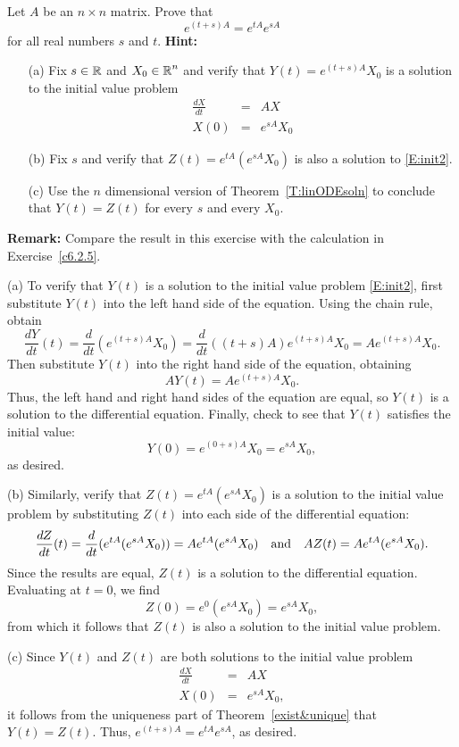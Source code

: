 \documentclass{ximera}
\begin{document}
\begin{computerExercise}  \label{c6.2.5B}
Let $A$ be an $n\times n$ matrix.  Prove that
\[
e^{(t+s)A} = e^{tA}e^{sA}
\]
for all real numbers $s$ and $t$.  {\bf Hint:}
\begin{itemize}
\item[(a)]  Fix $s\in\mbox{$\Bbb{R}$}$ and $X_0\in\mbox{$\Bbb{R}$}^n$ and verify that
$Y(t) = e^{(t+s)A}X_0$ is a solution to the initial value problem
\begin{equation}  \label{E:init2}
\begin{array}{rcl}
\frac{dX}{dt} & = & AX \\
X(0) & = & e^{sA}X_0
\end{array}
\end{equation}
\item[(b)] Fix $s$ and verify that $Z(t) = e^{tA}\left(e^{sA}X_0\right)$ is
also a solution to \eqref{E:init2}.
\item[(c)]  Use the $n$ dimensional version of Theorem~\ref{T:linODEsoln} to
conclude that $Y(t)=Z(t)$ for every $s$ and every $X_0$.
\end{itemize}
{\bf Remark:}  Compare the result in this exercise with the calculation in
Exercise~\ref{c6.2.5}.

\begin{solution}

(a) To verify that $Y(t)$ is a solution to the initial value problem
\eqref{E:init2}, first substitute $Y(t)$ into the left hand side of the
equation.  Using the chain rule, obtain
\[
\frac{dY}{dt}(t) = \frac{d}{dt}(e^{(t + s)A}X_0) =
\frac{d}{dt}((t + s)A)e^{(t + s)A}X_0 = Ae^{(t + s)A}X_0.
\]
Then substitute $Y(t)$ into the right hand side of the equation, obtaining
\[
AY(t) = Ae^{(t + s)A}X_0.
\]
Thus, the left hand and right hand sides of the equation are equal, so
$Y(t)$ is a solution to the differential equation.  Finally, check to see
that $Y(t)$ satisfies the initial value:
\[
Y(0) = e^{(0 + s)A}X_0 = e^{sA}X_0,
\]
as desired.

(b) Similarly, verify that $Z(t) = e^{tA}(e^{sA}X_0)$ is a solution to the
initial value problem by substituting $Z(t)$ into each side of the
differential equation:
\[
\frac{dZ}{dt}(t) = \frac{d}{dt}(e^{tA}(e^{sA}X_0))
= Ae^{tA}(e^{sA}X_0) \quad\mbox{and}\quad
AZ(t) = Ae^{tA}(e^{sA}X_0).
\]
Since the results are equal, $Z(t)$ is a solution to the differential
equation.  Evaluating at $t = 0$, we find
\[
Z(0) = e^{0}(e^{sA}X_0) = e^{sA}X_0,
\]
from which it follows that $Z(t)$ is also a solution to the initial
value problem.

(c) Since $Y(t)$ and $Z(t)$ are both solutions to the initial value problem
\[
\begin{array}{rcl}
\frac{dX}{dt} & = & AX \\
X(0) & = & e^{sA}X_0,
\end{array}
\]
it follows from the uniqueness part of Theorem~\ref{exist&unique} that
$Y(t) = Z(t)$.  Thus, $e^{(t + s)A} = e^{tA}e^{sA}$, as desired.


\end{solution}
\end{computerExercise}
\end{document}
